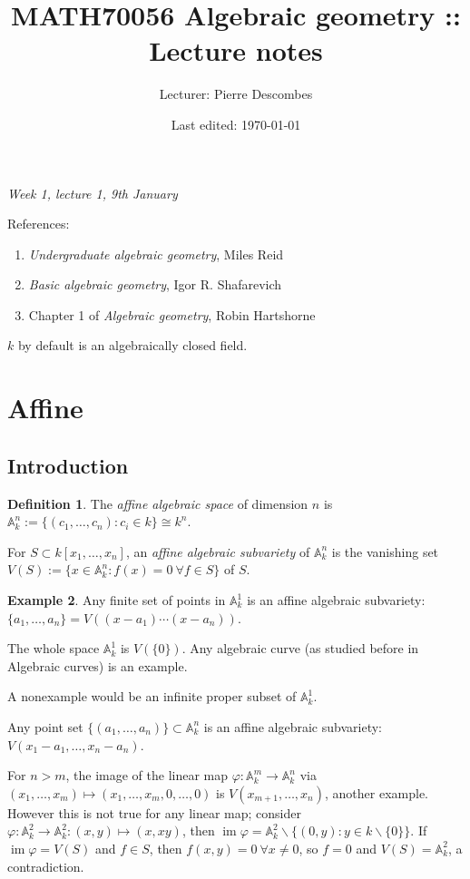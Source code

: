 \documentclass{article}
\title{MATH70056 Algebraic geometry :: Lecture notes}
\author{Lecturer: Pierre Descombes}
\date{Last edited: \today}
\newcommand{\A}{\mathbb{A}}
\newcommand{\im}{\operatorname{im}}
\theoremstyle{definition}
\newtheorem{defn}{Definition}[subsection]
\newtheorem{example}[defn]{Example}
\begin{document}
\maketitle
\thispagestyle{empty}

\tableofcontents
\thispagestyle{empty}
\newpage
\setcounter{page}{1}

\begin{flushright}
\textit{Week 1, lecture 1, 9th January}
\end{flushright}

References: \begin{enumerate}
\item \textit{Undergraduate algebraic geometry}, Miles Reid
\item \textit{Basic algebraic geometry}, Igor R. Shafarevich
\item Chapter 1 of \textit{Algebraic geometry}, Robin Hartshorne
\end{enumerate}

$k$ by default is an algebraically closed field.

\section{Affine}

\subsection{Introduction}

\begin{defn}
The \textit{affine algebraic space} of dimension $n$ is $\A_k^n:=\{(c_1,\ldots,c_n):c_i\in k\}\cong k^n$.

For $S\subset k[x_1,\ldots,x_n]$, an \textit{affine algebraic subvariety} of $\A_k^n$ is the vanishing set $V(S):=\{x\in\A_k^n:f(x)=0 \ \forall f\in S\}$ of $S$.
\end{defn}

\begin{example}
Any finite set of points in $\A_k^1$ is an affine algebraic subvariety: $\{a_1,\ldots,a_n\}=V((x-a_1)\cdots(x-a_n))$.

The whole space $\A_k^1$ is $V(\{0\})$. Any algebraic curve (as studied before in Algebraic curves) is an example.

A nonexample would be an infinite proper subset of $\A_k^1$.

Any point set $\{(a_1,\ldots,a_n)\}\subset\A_k^n$ is an affine algebraic subvariety: $V(x_1-a_1,\ldots,x_n-a_n)$.

For $n>m$, the image of the linear map $\varphi:\A_k^m\rightarrow\A_k^n$ via $(x_1,\ldots,x_m)\mapsto(x_1,\ldots,x_m,0,\ldots,0)$ is $V(x_{m+1},\ldots,x_n)$, another example. However this is not true for any linear map; consider $\varphi:\A_k^2\rightarrow\A_k^2:(x,y)\mapsto(x,xy)$, then $\im\varphi=\A_k^2\backslash\{(0,y):y\in k\backslash\{0\}\}$. If $\im\varphi=V(S)$ and $f\in S$, then $f(x,y)=0 \ \forall x\neq 0$, so $f=0$ and $V(S)=\A_k^2$, a contradiction.
\end{example}
\end{document}
